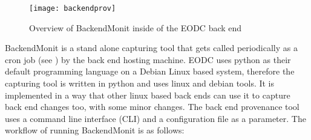 \documentclass[draft,final]{vutinfth} %
\begin{document}
\begin{figure}[h]
	\centering
	\texttt{[image: backendprov]}
	\caption{Overview of BackendMonit inside of the EODC back end}
	\label{fig:backendprov} %
\end{figure}

BackendMonit is a stand alone capturing tool that gets called periodically as a cron job (see \cite{crontab}) by the back end hosting machine. EODC uses python as their default programming language on a Debian Linux based system, therefore the capturing tool is written in python and uses linux and debian tools. It is implemented in a way that other linux based back ends can use it to capture back end changes too, with some minor changes. The back end provenance tool uses a command line interface (CLI)  and a configuration file as a parameter. 
The workflow of running BackendMonit is as follows: 
\end{document}
